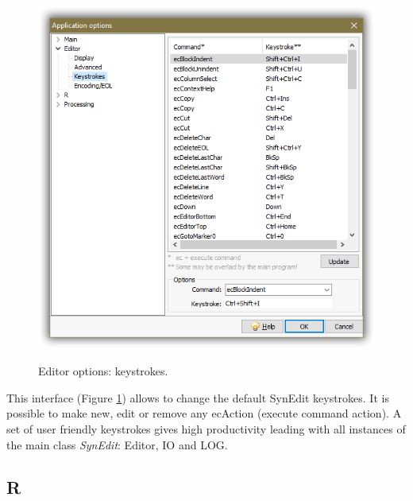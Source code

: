 \begin{figure}[h!]
  \includegraphics[scale=0.50]{./res/app_editor_keystrokes.png}\\
  \caption{Editor options: keystrokes.}
  \label{fig:editor_keystrokes}
\end{figure}

This interface
(Figure \ref{fig:editor_keystrokes})
allows to change the default SynEdit keystrokes.
It is possible to make new, edit or remove any ecAction (execute command action).
A set of user friendly keystrokes gives high productivity leading with
all instances of the main class \textit{SynEdit}: Editor, IO and LOG.


\hypertarget{working_app_r}{}
\subsection{R}

